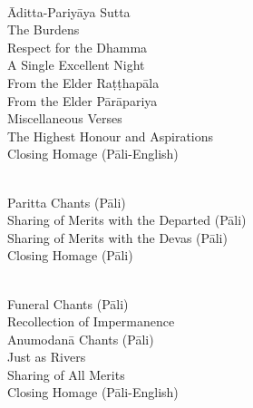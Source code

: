\begin{center}
  \medskip

  {\libertinusFont\selectfont\textbf{\textsc{}}}\\

  Āditta-Pariyāya Sutta\\
  The Burdens\\
  Respect for the Dhamma\\
  A Single Excellent Night\\
  From the Elder Raṭṭhapāla\\
  From the Elder Pārāpariya\\
  Miscellaneous Verses\\
  The Highest Honour and Aspirations\\
  Closing Homage (Pāli-English)\\ %

  \medskip

  {\libertinusFont\selectfont\textbf{\textsc{}}}\\

  Paritta Chants (Pāli)\\
  Sharing of Merits with the Departed (Pāli)\\
  Sharing of Merits with the Devas (Pāli)\\
  Closing Homage (Pāli)\\

  \medskip

  {\libertinusFont\selectfont\textbf{\textsc{}}}\\

  Funeral Chants (Pāli)\\
  Recollection of Impermanence\\
  Anumodanā Chants (Pāli)\\
  Just as Rivers\\
  Sharing of All Merits\\
  Closing Homage (Pāli-English)\\

\end{center}
